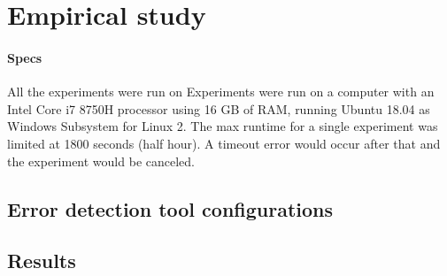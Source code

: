 \section{Empirical study}

\paragraph{Specs}
All the experiments were run on 
Experiments were run on a computer with an Intel Core i7 8750H processor using 16 GB of RAM, running Ubuntu 18.04 as Windows Subsystem for Linux 2. %
The max runtime for a single experiment was limited at 1800 seconds (half hour). A timeout error would occur after that and the experiment would be canceled. 



\subsection{Error detection tool configurations}


\subsection{Results}

